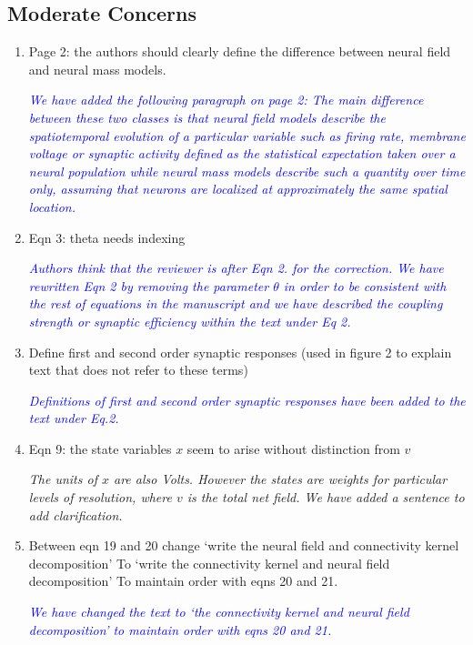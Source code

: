 \documentclass{article}
\newcommand{\parham}[1]{\textcolor{blue}{#1}}
\begin{document}
			\subsection{Moderate Concerns} 
			\begin{enumerate} 
			 \item Page 2: the authors should clearly define the difference between neural field and neural mass models.
			
			\emph{\parham{We have added the following paragraph on page 2: The main difference between these two classes is that neural field models describe the spatiotemporal evolution of a particular variable such as firing rate, membrane voltage or synaptic activity defined as the statistical expectation taken over a neural population while neural mass models describe such a quantity over time only, assuming that neurons are localized at approximately the same spatial location.}}
			
			\item Eqn 3: theta needs indexing 
 
			\emph{\parham{Authors think that the reviewer is after Eqn 2. for the correction.  We have rewritten Eqn 2 by removing the parameter $\theta$ in order to be consistent with the rest of equations in the manuscript and we have described the coupling strength or synaptic efficiency within the text under Eq 2.}}
 			
			\item Define first and second order synaptic responses (used in figure 2 to explain text that does not refer to these terms)
			
			\emph{\parham{Definitions of first and second order synaptic responses have been added to the text under Eq.2.}}
			
			\item{Eqn 9: the state variables $x$ seem to arise without distinction from $v$}  
			
			\emph{The units of $x$ are also Volts. However the states are weights for particular levels of resolution, where $v$ is the total net field. We have added a sentence to add clarification.}
			
			\item Between eqn 19 and 20 change
			`write the neural field and connectivity kernel decomposition' To `write the connectivity kernel and neural field decomposition'
			To maintain order with eqns 20 and 21.

			\emph{\parham{We have changed the text to `the connectivity kernel and neural field decomposition' to maintain order with eqns 20 and 21.}}
			
			 
			 \end{enumerate}  
\end{document}
